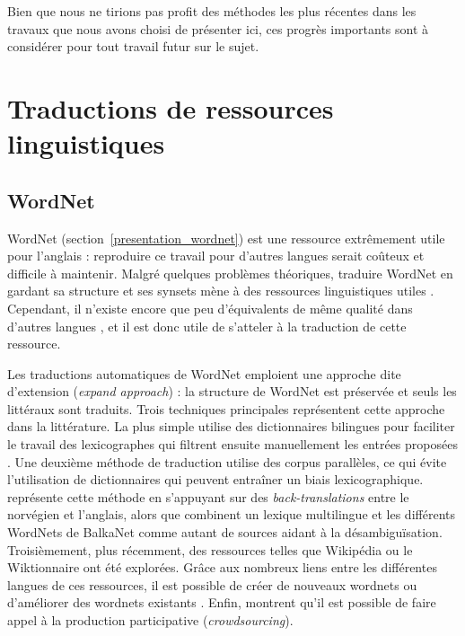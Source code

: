 Bien que nous ne tirions pas profit des méthodes les plus récentes dans les
travaux que nous avons choisi de présenter ici, ces progrès importants sont à
considérer pour tout travail futur sur le sujet.

\section{Traductions de ressources linguistiques}
\label{sec:translation}

\subsection{WordNet}

WordNet (section~\ref{presentation_wordnet}) est une ressource extrêmement
utile pour l'anglais : reproduire ce travail pour d'autres langues serait
coûteux et difficile à maintenir. Malgré quelques problèmes théoriques,
traduire WordNet en gardant sa structure et ses synsets mène à des ressources
linguistiques utiles \citep{fellbaum2007connecting,demelo2008utility}.
Cependant, il n'existe encore que peu d'équivalents de même qualité dans
d'autres langues \citep{bond2012survey}, et il est donc utile de s'atteler à la
traduction de cette ressource.

Les traductions automatiques de WordNet emploient une approche dite d'extension
(\textit{expand approach}) : la structure de WordNet est préservée et seuls les
littéraux sont traduits. Trois techniques principales représentent cette
approche dans la littérature. La plus simple utilise des dictionnaires
bilingues pour faciliter le travail des lexicographes qui filtrent ensuite
manuellement les entrées proposées
\citep{vossen1998eurowordnet,pianta2002developing,tufis2004balkanet}. Une
deuxième méthode de traduction utilise des corpus parallèles, ce qui évite
l'utilisation de dictionnaires qui peuvent entraîner un biais lexicographique.
\cite{dyvik2004translations} représente cette méthode en s'appuyant sur des
\textit{back-translations} entre le norvégien et l'anglais, alors que
\citep{sagot2008construction} combinent un lexique multilingue et les
différents WordNets de BalkaNet comme autant de sources aidant à la
désambiguïsation. Troisièmement, plus récemment, des ressources telles que
Wikipédia ou le Wiktionnaire ont été explorées. Grâce aux nombreux liens entre
les différentes langues de ces ressources, il est possible de créer de nouveaux
wordnets
\citep{demelo2009towards,navigli2010babelnet,bond2013linking,aliabadi2014towards,oliver2014wn}
ou d'améliorer des wordnets existants \citep{hanoka2012wordnet}. Enfin,
\cite{fiser2014slowcrowd} montrent qu'il est possible de faire appel à la
production participative (\textit{crowdsourcing}).

